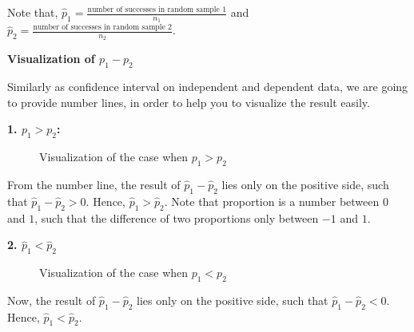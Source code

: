 Note that, $\hat{p}_1 = \frac{\text{number of successes in random sample 1}}{n_1}$ and $\hat{p}_2 = \frac{\text{number of successes in random sample 2}}{n_2}$.

\textbf{Visualization of $p_1 - p_2$}

Similarly as confidence interval on independent and dependent data, we are going to provide number lines, in order to help you to visualize the result easily.

\textbf{1. $p_1 > p_2$:}

\begin{center}
\begin{figure}[h!]
\centering
{}
\caption{Visualization of the case when $p_1 > p_2$}
\end{figure}
\end{center}

From the number line, the result of $\hat{p}_1 - \hat{p}_2$ lies only on the positive side, such that $\hat{p}_1 - \hat{p}_2 > 0$. Hence, $\hat{p}_1 > \hat{p}_2$. Note that proportion is a number between $0$ and $1$, such that the difference of two proportions only between $-1$ and $1$.

\textbf{2. $\hat{p}_1 < \hat{p}_2$}

\begin{center}
\begin{figure}[h!]
\centering
{}
\caption{Visualization of the case when $p_1 < p_2$}
\end{figure}
\end{center}

Now, the result of $\hat{p}_1 - \hat{p}_2$ lies only on the positive side, such that $\hat{p}_1 - \hat{p}_2 < 0$. Hence, $\hat{p}_1 < \hat{p}_2$.

